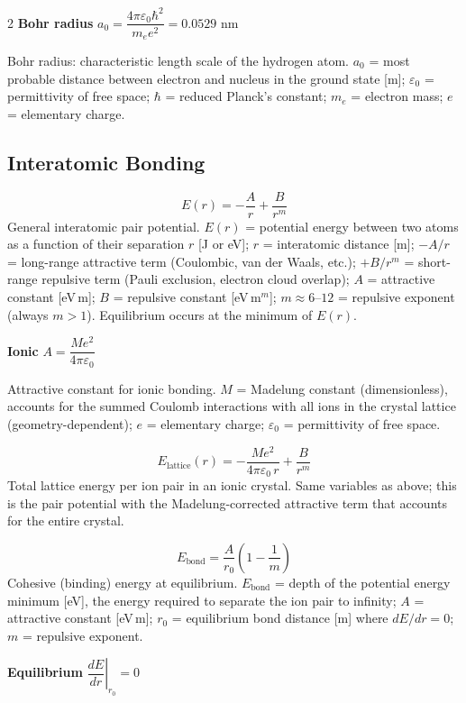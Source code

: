 \documentclass[9pt]{extarticle}
\newcommand{\eqlabel}[1]{\textbf{\scriptsize #1}\;}
\newcommand{\desc}[1]{{\small\color{desc}#1}}
\begin{document}
\begin{multicols}{2}
\eqlabel{Bohr radius} $a_0 = \dfrac{4\pi\varepsilon_0\hbar^2}{m_e e^2} = 0.0529$ nm

\desc{Bohr radius: characteristic length scale of the hydrogen atom. $a_0$ = most probable distance between electron and nucleus in the ground state [m]; $\varepsilon_0$ = permittivity of free space; $\hbar$ = reduced Planck's constant; $m_e$ = electron mass; $e$ = elementary charge.}


\subsection{Interatomic Bonding}
\[E(r) = -\frac{A}{r} + \frac{B}{r^m}\]
\desc{General interatomic pair potential. $E(r)$ = potential energy between two atoms as a function of their separation $r$ [J or eV]; $r$ = interatomic distance [m]; $-A/r$ = long-range attractive term (Coulombic, van der Waals, etc.); $+B/r^m$ = short-range repulsive term (Pauli exclusion, electron cloud overlap); $A$ = attractive constant [eV\,m]; $B$ = repulsive constant [eV\,m$^m$]; $m \approx 6$--$12$ = repulsive exponent (always $m > 1$). Equilibrium occurs at the minimum of $E(r)$.}

\eqlabel{Ionic} $A = \dfrac{Me^2}{4\pi\varepsilon_0}$

\desc{Attractive constant for ionic bonding. $M$ = Madelung constant (dimensionless), accounts for the summed Coulomb interactions with all ions in the crystal lattice (geometry-dependent); $e$ = elementary charge; $\varepsilon_0$ = permittivity of free space.}

\[E_{\text{lattice}}(r) = -\frac{Me^2}{4\pi\varepsilon_0\,r} + \frac{B}{r^m}\]
\desc{Total lattice energy per ion pair in an ionic crystal. Same variables as above; this is the pair potential with the Madelung-corrected attractive term that accounts for the entire crystal.}

\[E_{\text{bond}} = \frac{A}{r_0}\left(1 - \frac{1}{m}\right)\]
\desc{Cohesive (binding) energy at equilibrium. $E_{\text{bond}}$ = depth of the potential energy minimum [eV], the energy required to separate the ion pair to infinity; $A$ = attractive constant [eV\,m]; $r_0$ = equilibrium bond distance [m] where $dE/dr = 0$; $m$ = repulsive exponent.}

\eqlabel{Equilibrium} $\left.\dfrac{dE}{dr}\right|_{r_0}=0$


\end{multicols}
\end{document}
